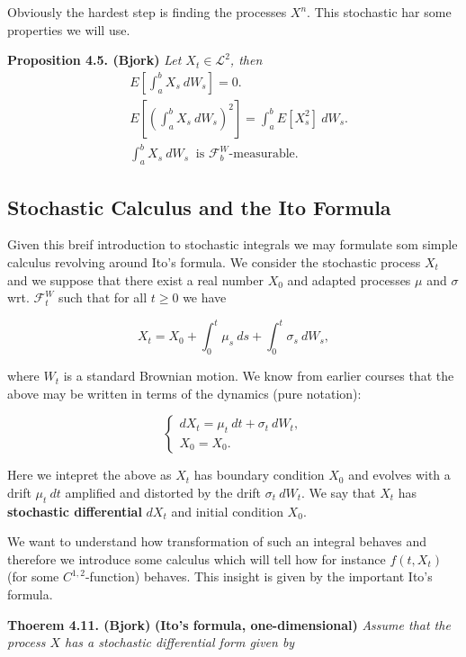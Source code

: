 \documentclass[a4paper,12pt,openany]{book}
\begin{document}
Obviously the hardest step is finding the processes \(X^n\). This stochastic har some properties we will use.

\textbf{Proposition 4.5. (Bjork)} \emph{Let \(X_t\in\mathcal{L}^2\), then}
\begin{align*}
&E\left[\int_a^b X_s\ dW_s\right]=0.\tag{4.12}\\
&E\left[\left(\int_a^b X_s\ dW_s\right)^2\right]=\int_a^b E[ X_s^2]\ dW_s.\tag{4.13}\\
&\int_a^b X_s\ dW_s\ \text{ is }\mathcal{F}_b^W\text{-measurable.}\tag{4.14}
\end{align*}

\hypertarget{stochastic-calculus-and-the-ito-formula}{%
\subsection{Stochastic Calculus and the Ito Formula}\label{stochastic-calculus-and-the-ito-formula}}

Given this breif introduction to stochastic integrals we may formulate som simple calculus revolving around Ito's formula. We consider the stochastic process \(X_t\) and we suppose that there exist a real number \(X_0\) and adapted processes \(\mu\) and \(\sigma\) wrt. \(\mathcal{F}_t^W\) such that for all \(t\ge0\) we have

\[
X_t=X_0+\int_0^t\mu_s\ ds+\int_0^t\sigma_s\ dW_s,\tag{4.16}
\]

where \(W_t\) is a standard Brownian motion. We know from earlier courses that the above may be written in terms of the dynamics (pure notation):

\[
\left\{\begin{matrix}dX_t=\mu_t\ dt+\sigma_t\ dW_t,\tag{4.17/18}\\ X_0=X_0.\end{matrix}\right.
\]

Here we intepret the above as \(X_t\) has boundary condition \(X_0\) and evolves with a drift \(\mu_t\ dt\) amplified and distorted by the drift \(\sigma_t\ dW_t\). We say that \(X_t\) has \textbf{stochastic differential} \(dX_t\) and initial condition \(X_0\).

We want to understand how transformation of such an integral behaves and therefore we introduce some calculus which will tell how for instance \(f(t,X_t)\) (for some \(C^{1,2}\)-function) behaves. This insight is given by the important Ito's formula.

\textbf{Thoerem 4.11. (Bjork)} \textbf{(Ito's formula, one-dimensional)} \emph{Assume that the process \(X\) has a stochastic differential form given by}
\end{document}
